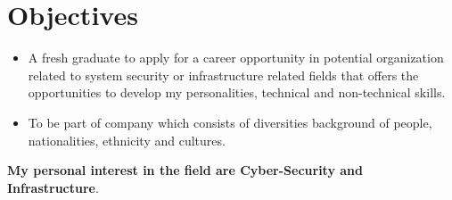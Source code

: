 \vspace{0.2cm}
\section{Objectives}
\vspace{-0.2cm}
    \begin{itemize}[noitemsep]
        \item A fresh graduate to apply for a career opportunity in potential organization related to system security or infrastructure related fields that offers the opportunities to develop my personalities, technical and non-technical skills. 
        \item To be part of company which consists of diversities background of people, nationalities, ethnicity and cultures.
    \end{itemize}
\textbf{My personal interest in the field are Cyber-Security and Infrastructure}.